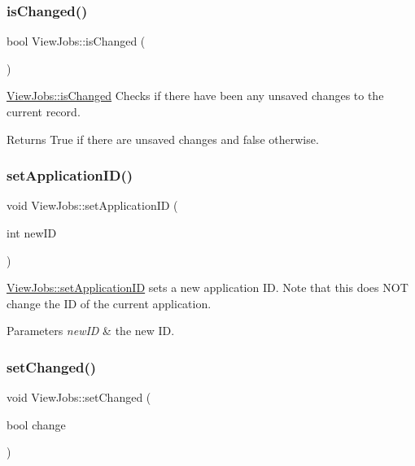 \subsubsection{\texorpdfstring{is\+Changed()}{isChanged()}}
{\footnotesize\ttfamily bool View\+Jobs\+::is\+Changed (\begin{DoxyParamCaption}{ }\end{DoxyParamCaption})}



\mbox{\hyperlink{class_view_jobs_a5f75b45d28ce7f4a8050ce9ce0f44350}{View\+Jobs\+::is\+Changed}} Checks if there have been any unsaved changes to the current record. 

\begin{DoxyReturn}{Returns}
True if there are unsaved changes and false otherwise. 
\end{DoxyReturn}
\mbox{\label{class_view_jobs_acd43a8c32ab9bca7e40ecc99e51da9b8}} 
\subsubsection{\texorpdfstring{set\+Application\+I\+D()}{setApplicationID()}}
{\footnotesize\ttfamily void View\+Jobs\+::set\+Application\+ID (\begin{DoxyParamCaption}\item[{int}]{new\+ID }\end{DoxyParamCaption})}



\mbox{\hyperlink{class_view_jobs_acd43a8c32ab9bca7e40ecc99e51da9b8}{View\+Jobs\+::set\+Application\+ID}} sets a new application ID. Note that this does N\+OT change the ID of the current application. 


\begin{DoxyParams}{Parameters}
{\em new\+ID} & the new ID. \\
\hline
\end{DoxyParams}
\mbox{\label{class_view_jobs_a3cba868c6deadaf4b35c18982f7ec35e}} 
\subsubsection{\texorpdfstring{set\+Changed()}{setChanged()}}
{\footnotesize\ttfamily void View\+Jobs\+::set\+Changed (\begin{DoxyParamCaption}\item[{bool}]{change }\end{DoxyParamCaption})}



